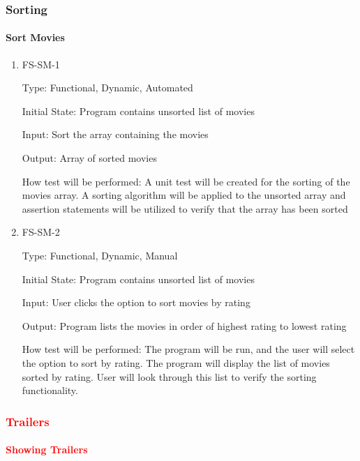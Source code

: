\documentclass[12pt, titlepage]{article}
\begin{document}
\subsubsection{Sorting}

\paragraph{Sort Movies}

\begin{enumerate}
	
	\item{FS-SM-1\\}
	
	Type: Functional, Dynamic, Automated
	
	Initial State: Program contains unsorted list of movies
	
	Input: Sort the array containing the movies
	
	Output: Array of sorted movies
	
	How test will be performed: A unit test will be created for the sorting of the movies array. A sorting algorithm will be applied to the unsorted array and assertion statements will be utilized to verify that the array has been sorted
	
	\item{FS-SM-2\\}
	
	Type: Functional, Dynamic, Manual
	
	Initial State: Program contains unsorted list of movies
	
	Input: User clicks the option to sort movies by rating
	
	Output: Program lists the movies in order of highest rating to lowest rating
	
	How test will be performed: The program will be run, and the user will select the option to sort by rating. The program will display the list of movies sorted by rating. User will look through this list to verify the sorting functionality.
	
\end{enumerate}

\subsubsection{\textcolor{red}{Trailers}}

\paragraph{\textcolor{red}{Showing Trailers}}
\end{document}
